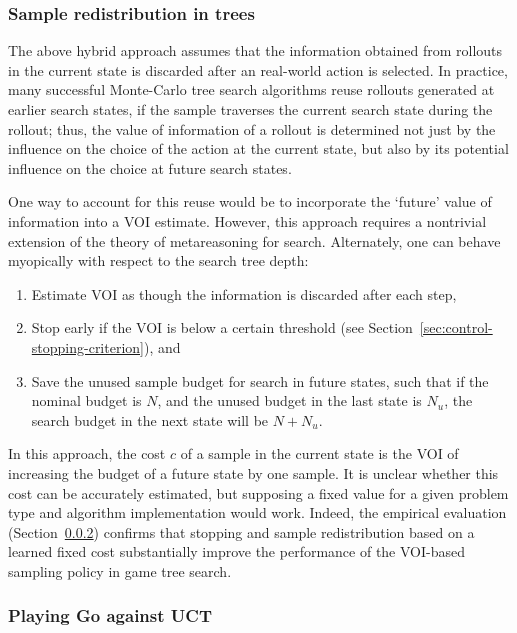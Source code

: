 \subsubsection{Sample redistribution in trees}
\label{sec:control-redistribution}

The above hybrid approach assumes
that the information obtained from rollouts in the
current state is discarded after an real-world action is selected. In practice,
many successful Monte-Carlo tree search algorithms reuse rollouts
generated at earlier search states, if the sample traverses the
current search state during the rollout; thus, the value of information of a rollout is
determined not just by the influence on the choice of the action at
the current state, but also by its potential influence on the choice at future
search states.

One way to account for this reuse would be to incorporate the
`future' value of information into a VOI estimate. However, this 
approach requires a nontrivial extension of the theory of metareasoning for search.
Alternately, one can behave myopically with respect to the search tree depth:
\begin{enumerate}
\item Estimate VOI as though the information is discarded after each step,
\item Stop early if the VOI is below a certain threshold
   (see Section~\ref{sec:control-stopping-criterion}), and
\item Save the unused sample budget for search in future states, such that
   if the nominal budget is $N$, and the unused budget in the last state
   is $N_u$, the search budget in the next state will be $N+N_u$.
\end{enumerate}
In this approach, the cost $c$ of a sample in the current state is the
VOI of increasing the budget of a future state by one sample.  It is
unclear whether this cost can be accurately estimated, but supposing
a fixed value for a given problem type and algorithm implementation
would work. Indeed, the empirical evaluation (Section~\ref{sec:emp-go})
confirms that stopping and sample redistribution based on a learned
fixed cost  substantially improve the performance of the VOI-based
sampling policy in game tree search.


\subsubsection{Playing Go against UCT}
\label{sec:emp-go}

